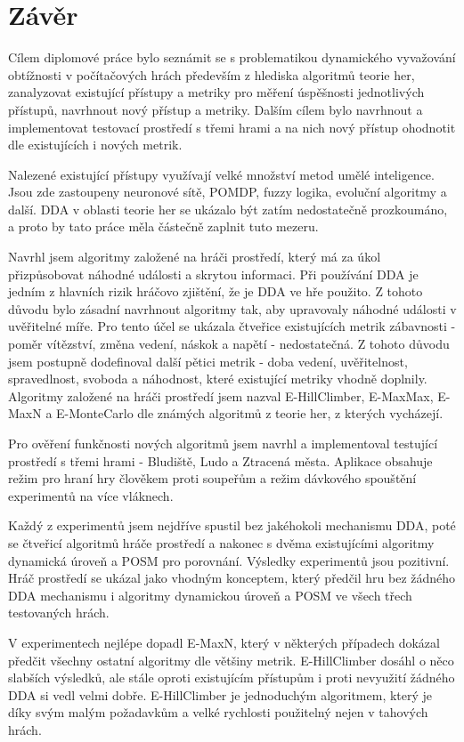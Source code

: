 \chapter{Závěr}

Cílem diplomové práce bylo seznámit se s problematikou dynamického vyvažování obtížnosti v počítačových hrách především z hlediska algoritmů teorie her, zanalyzovat existující přístupy a metriky pro měření úspěšnosti jednotlivých přístupů, navrhnout nový přístup a metriky. Dalším cílem bylo navrhnout a implementovat testovací prostředí s třemi hrami a na nich nový přístup ohodnotit dle existujících i nových metrik. 

Nalezené existující přístupy využívají velké množství metod umělé inteligence. Jsou zde zastoupeny neuronové sítě, POMDP, fuzzy logika, evoluční algoritmy a další. DDA v oblasti teorie her se ukázalo být zatím nedostatečně prozkoumáno, a proto by tato práce měla částečně zaplnit tuto mezeru.

Navrhl jsem algoritmy založené na hráči prostředí, který má za úkol přizpůsobovat náhodné události a skrytou informaci. Při používání DDA je jedním z hlavních rizik hráčovo zjištění, že je DDA ve hře použito. Z tohoto důvodu bylo zásadní navrhnout algoritmy tak, aby upravovaly náhodné události v uvěřitelné míře. Pro tento účel se ukázala čtveřice existujících metrik zábavnosti - poměr vítězství, změna vedení, náskok a napětí - nedostatečná. Z tohoto důvodu jsem postupně dodefinoval další pětici metrik - doba vedení, uvěřitelnost, spravedlnost, svoboda a náhodnost, které existující metriky vhodně doplnily. Algoritmy založené na hráči prostředí jsem nazval E-HillClimber, E-MaxMax, E-MaxN a E-MonteCarlo dle známých algoritmů z teorie her, z kterých vycházejí.

Pro ověření funkčnosti nových algoritmů jsem navrhl a implementoval testující prostředí s třemi hrami - Bludiště, Ludo a Ztracená města. Aplikace obsahuje režim pro hraní hry člověkem proti soupeřům a režim dávkového spouštění experimentů na více vláknech.

Každý z experimentů jsem nejdříve spustil bez jakéhokoli mechanismu DDA, poté se čtveřicí algoritmů hráče prostředí a nakonec s dvěma existujícími algoritmy dynamická úroveň a POSM pro porovnání. Výsledky experimentů jsou pozitivní. Hráč prostředí se ukázal jako vhodným konceptem, který předčil hru bez žádného DDA mechanismu i algoritmy dynamickou úroveň a POSM ve všech třech testovaných hrách. 

V experimentech nejlépe dopadl E-MaxN, který v některých případech dokázal předčit všechny ostatní algoritmy dle většiny metrik. E-HillClimber dosáhl o něco slabších výsledků, ale stále oproti existujícím přístupům i proti nevyužití žádného DDA si vedl velmi dobře. E-HillClimber je jednoduchým algoritmem, který je díky svým malým požadavkům a velké rychlosti použitelný nejen v tahových hrách.


